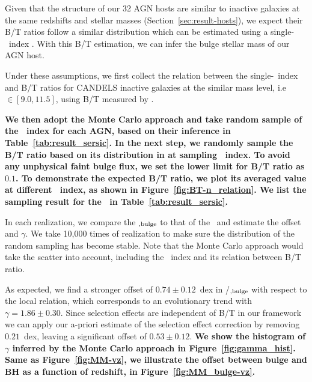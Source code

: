 \documentclass[apj]{emulateapj}
\begin{document}
Given that the structure of our 32 AGN hosts are similar to inactive
galaxies at the same redshifts and stellar masses
(Section~\ref{sec:result-hosts}), we expect their B/T ratios follow
a similar distribution which can be estimated using a single-\sersic\
index \citep{Bruce2014}. With this B/T estimation, we can infer the
bulge stellar mass of our AGN host.

Under these assumptions, we first collect the relation between the
single-\sersic\ index and B/T ratios for CANDELS inactive galaxies
at the similar mass level, i.e \smass$\in [9.0, 11.5]$, using B/T
measured by \citet{Dimauro2018}. {\bf We then adopt the Monte Carlo approach
and take random sample of the \sersic\ index for each AGN, based on their
inference in Table~\ref{tab:result_sersic}. In the next step, we randomly
sample the B/T ratio based on its distribution in \citet{Dimauro2018}
at sampling \sersic\ index. To avoid any unphysical faint bulge flux, we
set the lower limit for B/T ratio as $0.1$. 
To demonstrate the expected B/T ratio, we plot its averaged value at
different \sersic\ index, as shown in Figure~\ref{fig:BT-n_relation}. 
We list the sampling result for the \bmass\ in Table~\ref{tab:result_sersic}.

In each realization, we compare the
\smass$_{\rm, bulge}$ to that of the \mbh\ and estimate the offset and $\gamma$. 
We take 10,000 times of realization to make sure the distribution of the
random sampling has become stable. Note that the Monte Carlo approach would
take the scatter into account, including the \sersic\ index
and its relation between B/T ratio.
} 

As expected, we find a stronger offset of
$0.74\pm0.12$~dex in \mbh/\smass$_{\rm, bulge}$ with respect to the
local relation, which corresponds to an evolutionary trend with
$\gamma = 1.86\pm0.30$. Since selection effects are independent of B/T in
our framework we can apply our a-priori estimate of the selection
effect correction by removing $0.21$~dex, leaving a significant offset
of $0.53\pm0.12$. {\bf We show the histogram of $\gamma$ inferred by
the Monte Carlo approach in Figure~\ref{fig:gamma_hist}. Same as
Figure~\ref{fig:MM-vz}, we illustrate the offset between bulge and BH
as a function of redshift, in Figure~\ref{fig:MM_bulge-vz}.}
\end{document}
